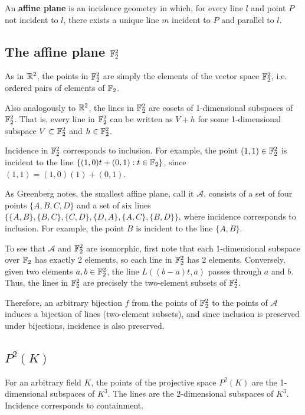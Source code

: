 \documentclass{article}
\begin{document}
\begin{definition} 
An \textbf{affine plane} is an incidence geometry in which, for every line $l$ and point $P$ not incident to $l$, there exists a unique line $m$ incident to $P$ and parallel to $l$.
\end{definition}


\subsection{The affine plane $\mathbb{F}_2^2$}
As in $\mathbb{R}^2$, the points in $\mathbb{F}_2^2$ are simply the elements of the vector space $\mathbb{F}_2^2$, i.e. ordered pairs of elements of $\mathbb{F}_2$.  

Also analogously to $\mathbb{R}^2$, the lines in $\mathbb{F}_2^2$ are cosets of 1-dimensional subspaces of $\mathbb{F}_2^2$.  That is, every line in $\mathbb{F}_2^2$ can be written as $V + h$ for some 1-dimensional subspace $V\subset \mathbb{F}_2^2$ and $h \in \mathbb{F}_2^2$.  

Incidence in $\mathbb{F}_2^2$ corresponds to inclusion.  For example, the point $(1,1) \in \mathbb{F}_2^2$ is incident to the line $\{(1,0)t + (0,1): t \in \mathbb{F}_2\}$, since $(1,1) = (1,0) (1) + (0,1)$.

As Greenberg notes, the smallest affine plane, call it $\mathcal{A}$, consists of a set of four points $\{A,B,C,D\}$ and a set of six lines $\{\{A,B\}, \{B,C\}, \{C,D\}, \{D,A\}, \{A,C\}, \{B,D\}\}$, where incidence corresponds to inclusion. For example, the point $B$ is incident to the line $\{A,B\}$.

To see that $\mathcal{A}$ and $\mathbb{F}_2^2$ are isomorphic, first note that each 1-dimensional subspace over $\mathbb{F}_2$ has exactly 2 elements, so each line in $\mathbb{F}_2^2$ has 2 elements.  Conversely, given two elements $a,b \in \mathbb{F}_2^2$, the line $L((b-a)t, a)$ passes through $a$ and $b$.  Thus, the lines in $\mathbb{F}_2^2$ are precisely the two-element subsets of $\mathbb{F}_2^2$. 

Therefore, an arbitrary bijection $f$ from the points of $\mathbb{F}_2^2$ to the points of $\mathcal A$ induces a bijection of lines (two-element subsets), and since inclusion is preserved under bijections, incidence is also preserved. 

\subsection{$P^2(K)$}
For an arbitrary field $K$, the points of the projective space $P^2(K)$ are the 1-dimensional subspaces of $K^3$.  The lines are the 2-dimensional subspaces of $K^3$.  Incidence corresponds to containment. 
\end{document}
